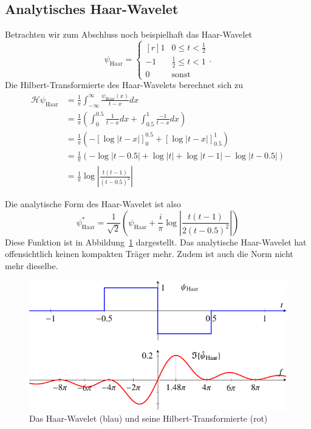 \begin{refsection}
\subsection{Analytisches Haar-Wavelet}
Betrachten wir zum Abschluss noch beispielhaft das Haar-Wavelet
\[
	\psi_{\text{Haar}} = \left\lbrace\begin{matrix*}[r]
		1 & 0 \le t < \frac{1}{2} \\
		-1 & \frac{1}{2} \le t < 1 \\
		0 & \text{sonst}
	\end{matrix*} \right..
\]
Die Hilbert-Transformierte des Haar-Wavelets berechnet sich zu
\begin{align*}
	\mathcal{H} \psi_{\text{Haar}}
	&= \frac{1}{\pi} \int_{-\infty}^{\infty} \frac{\psi_{\text{Haar}}(x)}{t-x} dx\\
	&= \frac{1}{\pi}\left( \int_{0}^{0.5} \frac{1}{t-x}dx + \int_{0.5}^{1} \frac{-1}{t-x}dx \right)\\
	&= \frac{1}{\pi} \left( -\left[\log \left|t-x\right| \right]_0^{0.5} + \left[\log\left|t-x\right| \right]_{0.5}^{1} \right)\\
	&= \frac{1}{\pi} \left( -\log\left|t-0.5\right| + \log\left|t\right| + \log\left|t-1\right| - \log\left|t-0.5\right|\right)\\
	&= \frac{1}{\pi} \log\left|\frac{t(t-1)}{(t-0.5)^2}\right|
\end{align*}

Die analytische Form des Haar-Wavelet ist also
\[
 \psi^\ast_{\text{Haar}} = \frac{1}{\sqrt{2}}\left(\psi_{\text{Haar}} + \frac{i}{\pi} \log\left|\frac{t(t-1)}{2(t-0.5)^2}\right|\right)
\]
Diese Funktion ist in Abbildung~\ref{complex:haar} dargestellt.
Das analytische Haar-Wavelet hat offensichtlich keinen kompakten Träger mehr.
Zudem ist auch die Norm nicht mehr dieselbe.

\begin{figure}
	\centering
	\includegraphics{papers/complex/images/haar.pdf}
	\caption{Das Haar-Wavelet (blau) und seine Hilbert-Transformierte (rot)
		\label{complex:haar}}
\end{figure}


\end{refsection}
